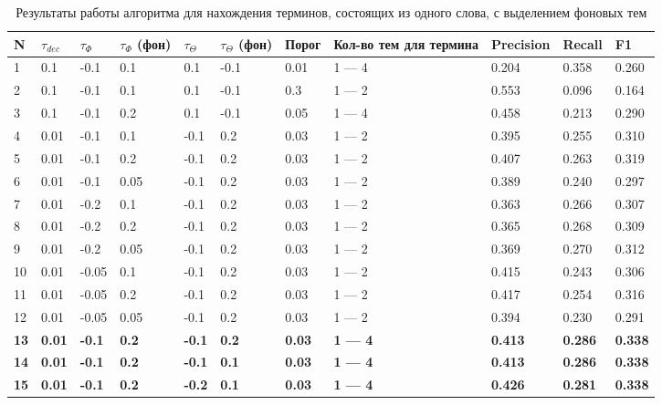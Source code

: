 \documentclass[a4paper, 12pt]{article}
\begin{document}
\begin{table}[!ht]
    \caption{Результаты работы алгоритма для нахождения терминов, состоящих из одного слова, с выделением фоновых тем}
    \label{table:Res_2}
    \centering\medskip
    \begin{tabular}{|l|l|l|l|l|l|l|p{50 pt}|l|l|l|}
    \hline
        N & $\tau_{dec}$ & $\tau_{\Phi}$ & $\tau_{\Phi}$ (фон) & $\tau_{\Theta}$  & $\tau_{\Theta}$ (фон) & Порог & Кол-во тем для термина & Precision & Recall & F1 \\ \hline
        1 & 0.1 & -0.1 & 0.1 & 0.1 & -0.1 & 0.01 & 1 — 4 & 0.204 & 0.358 & 0.260 \\ \hline
        2 & 0.1 & -0.1 & 0.1 & 0.1 & -0.1 & 0.3 & 1 — 2 & 0.553 & 0.096 & 0.164 \\ \hline
        3 & 0.1 & -0.1 & 0.2 & 0.1 & -0.1 & 0.05 & 1 — 4 & 0.458 & 0.213 & 0.290 \\ \hline
        4 & 0.01 & -0.1 & 0.1 & -0.1 & 0.2 & 0.03 & 1 — 2 & 0.395  & 0.255 & 0.310 \\ \hline
        5 & 0.01 & -0.1 & 0.2 & -0.1 & 0.2 & 0.03 & 1 — 2 & 0.407 & 0.263 & 0.319 \\ \hline
        6 & 0.01 & -0.1 & 0.05 & -0.1 & 0.2 & 0.03 & 1 — 2 & 0.389 & 0.240 & 0.297 \\ \hline
        7 & 0.01 & -0.2 & 0.1 & -0.1 & 0.2 & 0.03 & 1 — 2 & 0.363 & 0.266 & 0.307 \\ \hline
        8 & 0.01 & -0.2 & 0.2 & -0.1 & 0.2 & 0.03 & 1 — 2 & 0.365 & 0.268 & 0.309 \\ \hline
        9 & 0.01 & -0.2 & 0.05 & -0.1 & 0.2 & 0.03 & 1 — 2 & 0.369 & 0.270 & 0.312 \\ \hline
        10 & 0.01 & -0.05 & 0.1 & -0.1 & 0.2 & 0.03 & 1 — 2 & 0.415 & 0.243 & 0.306 \\ \hline
        11 & 0.01 & -0.05 & 0.2 & -0.1 & 0.2 & 0.03 & 1 — 2 & 0.417 & 0.254 & 0.316 \\ \hline
        12 & 0.01 & -0.05 & 0.05 & -0.1 & 0.2 & 0.03 & 1 — 2 & 0.394 & 0.230 & 0.291 \\ \hline
        \textbf{13} & \textbf{0.01} & \textbf{-0.1} & \textbf{0.2} & \textbf{-0.1} & \textbf{0.2} & \textbf{0.03} & \textbf{1 — 4} & \textbf{0.413} & \textbf{0.286} & \textbf{0.338} \\ \hline
        \textbf{14} & \textbf{0.01} & \textbf{-0.1} & \textbf{0.2} & \textbf{-0.1} & \textbf{0.1} & \textbf{0.03} & \textbf{1 — 4} & \textbf{0.413} & \textbf{0.286} & \textbf{0.338} \\ \hline
        \textbf{15} & \textbf{0.01} & \textbf{-0.1} & \textbf{0.2} & \textbf{-0.2} & \textbf{0.1} & \textbf{0.03} & \textbf{1 — 4} & \textbf{0.426} & \textbf{0.281} & \textbf{0.338} \\ \hline

\end{tabular}
\end{table}
\end{document}
